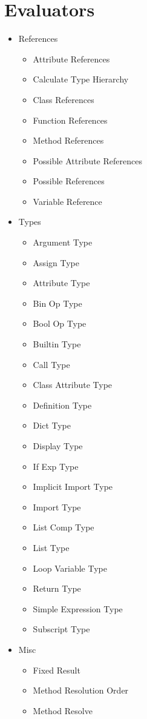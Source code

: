 \documentclass[12pt,halfparskip,DIV11,BCOR10mm]{scrreprt}
\begin{document}
\section{Evaluators}


\begin{itemize}
    \item References
    \begin{itemize}
        \item Attribute References
        \item Calculate Type Hierarchy
        \item Class References
        \item Function References
        \item Method References
        \item Possible Attribute References
        \item Possible References
        \item Variable Reference
    \end{itemize}
    \item Types
    \begin{itemize}
        \item Argument Type
        \item Assign Type
        \item Attribute Type
        \item Bin Op Type
        \item Bool Op Type
        \item Builtin Type
        \item Call Type
        \item Class Attribute Type
        \item Definition Type
        \item Dict Type
        \item Display Type
        \item If Exp Type
        \item Implicit Import Type
        \item Import Type
        \item List Comp Type
        \item List Type
        \item Loop Variable Type
        \item Return Type
        \item Simple Expression Type
        \item Subscript Type
    \end{itemize}
    \item Misc
    \begin{itemize}
        \item Fixed Result
        \item Method Resolution Order
        \item Method Resolve
    \end{itemize}
\end{itemize}

\listoffigures



\end{document}
